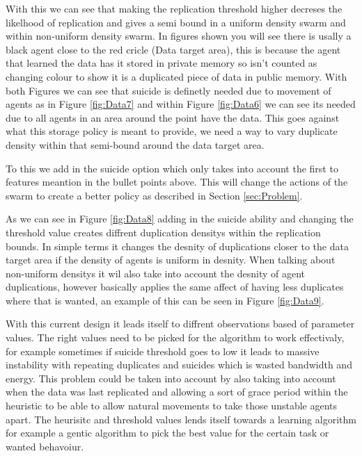 \documentclass{UoYCSproject}
\begin{document}
With this we can see that making the replication threshold higher decreses the likelhood of replication and gives a semi bound in a uniform density swarm and within non-uniform density swarm.
In figures shown you will see there is usally a black agent close to the red cricle (Data target area), this is because the agent that learned the data has it stored in private memory so isn't counted as changing colour to show it is a duplicated piece of data in public memory.
With both Figures we can see that suicide is definetly needed due to movement of agents as in Figure \ref{fig:Data7} and within Figure \ref{fig:Data6} we can see its needed due to all agents in an area around the point have the data.
This goes against what this storage policy is meant to provide, we need a way to vary duplicate density within that semi-bound around the data target area.

To this we add in the suicide option which only takes into account the first to features meantion in the bullet points above.
This will change the actions of the swarm to create a better policy as described in Section \ref{sec:Problem}.

As we can see in Figure \ref{fig:Data8} adding in the suicide ability and changing the threshold value creates diffrent duplication densitys within the replication bounds.
In simple terms it changes the desnity of duplications closer to the data target area if the density of agents is uniform in desnity.
When talking about non-uniform densitys it wil also take into account the desnity of agent duplications, however basically applies the same affect of having less duplicates where that is wanted, an example of this can be seen in Figure \ref{fig:Data9}.

With this current design it leads itself to diffrent observations based of parameter values.
The right values need to be picked for the algorithm to work effectivaly, for example sometimes if suicide threshold goes to low it leads to massive instability with repeating duplicates and suicides which is wasted bandwidth and energy.
This problem could be taken into account by also taking into account when the data was last replicated and allowing a sort of grace period within the heuristic to be able to allow natural movements to take those unstable agents apart.
The heurisitc and threshold values lends itself towards a learning algorithm for example a gentic algorithm to pick the best value for the certain task or wanted behavoiur.
\end{document}
